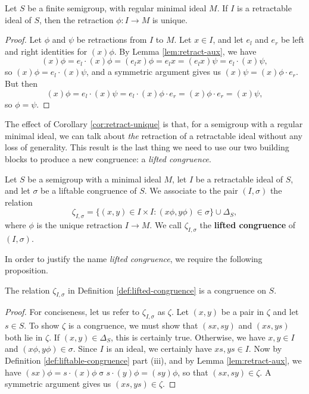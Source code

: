 \begin{corollary}
  \label{cor:retract-unique}
  Let $S$ be a finite semigroup, with regular minimal ideal $M$.  If $I$ is a
  retractable ideal of $S$, then the retraction $\phi:I \to M$ is unique.
  \begin{proof}
    Let $\phi$ and $\psi$ be retractions from $I$ to $M$.  Let $x \in I$,
    and let $e_l$ and $e_r$ be left and right identities for $(x)\phi$.  By
    Lemma \ref{lem:retract-aux}, we have
    $$(x)\phi
    = e_l \cdot (x)\phi
    = (e_lx)\phi
    = e_lx
    = (e_lx)\psi
    = e_l \cdot (x)\psi,$$
    so $(x)\phi = e_l \cdot (x)\psi$, and a symmetric argument gives us
    $(x)\psi = (x)\phi \cdot e_r$.  But then
    $$(x)\phi
    = e_l \cdot (x)\psi
    = e_l \cdot (x)\phi \cdot e_r
    = (x)\phi \cdot e_r
    = (x)\psi,$$
    so $\phi = \psi$.
  \end{proof}
\end{corollary}

The effect of Corollary \ref{cor:retract-unique} is that, for a semigroup with a
regular minimal ideal, we can talk about \textit{the} retraction of a
retractable ideal without any loss of generality.  This result is the last thing
we need to use our two building blocks to produce a new congruence: a
\textit{lifted congruence}.

\begin{definition}
  \label{def:lifted-congruence}
  Let $S$ be a semigroup with a minimal ideal $M$, let $I$ be a retractable
  ideal of $S$, and let $\sigma$ be a liftable congruence of $S$.  We associate
  to the pair $(I,\sigma)$ the relation
  $$\zeta_{I,\sigma}
  = \{(x,y) \in I \times I : (x\phi,y\phi) \in \sigma\} \cup \Delta_S,$$
  where $\phi$ is the unique retraction $I \to M$.
  We call $\zeta_{I,\sigma}$ the \textbf{lifted congruence} of $(I,\sigma)$.
\end{definition}

In order to justify the name \textit{lifted congruence}, we require the
following proposition.

\begin{proposition}
  \label{prop:lift}
  The relation $\zeta_{I,\sigma}$ in Definition \ref{def:lifted-congruence} is a
  congruence on $S$.
  \begin{proof}
    For conciseness, let us refer to $\zeta_{I,\sigma}$ as $\zeta$.  Let $(x,y)$
    be a pair in $\zeta$ and let $s \in S$.  To show $\zeta$ is a congruence, we
    must show that $(sx,sy)$ and $(xs,ys)$ both lie in $\zeta$.  If
    $(x,y) \in \Delta_S$, this is certainly true.  Otherwise, we have
    $x, y \in I$ and $(x\phi, y\phi) \in \sigma$.  Since $I$ is an ideal, we
    certainly have $xs,ys\in I$.  Now by Definition
    \ref{def:liftable-congruence} part (iii), and by Lemma
    \ref{lem:retract-aux}, we have
    $(sx)\phi = s \cdot (x)\phi \mathrel\sigma s \cdot (y)\phi = (sy)\phi$, so
    that $(sx, sy) \in \zeta$.  A symmetric argument gives us
    $(xs,ys) \in \zeta$.
  \end{proof}
\end{proposition}

